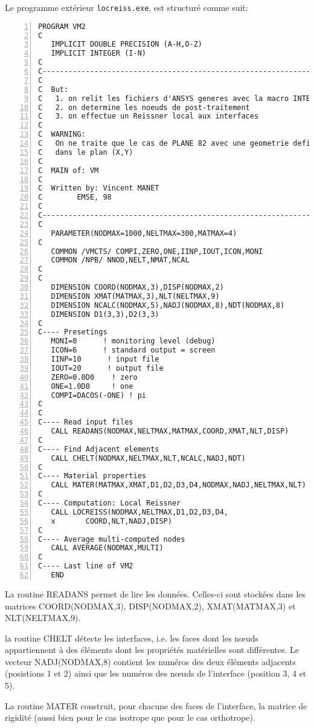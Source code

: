Le programme extérieur \verb|locreiss.exe|, est structuré comme suit:

\color{gris}\scriptsize
\begin{Verbatim}[numbers=left,numbersep=3pt]
   PROGRAM VM2
C
   IMPLICIT DOUBLE PRECISION (A-H,O-Z)
   IMPLICIT INTEGER (I-N)
C
C--------------------------------------------------------------------------
C
C  But:
C   1. on relit les fichiers d'ANSYS generes avec la macro INTERF
C   2. on determine les noeuds de post-traitement
C   3. on effectue un Reissner local aux interfaces
C
C  WARNING:
C   On ne traite que le cas de PLANE 82 avec une geometrie definie
C   dans le plan (X,Y)
C
C  MAIN of: VM
C
C  Written by: Vincent MANET
C        EMSE, 98
C
C----------------------------------------------------------------------------
C
   PARAMETER(NODMAX=1000,NELTMAX=300,MATMAX=4)
C
   COMMON /VMCTS/ COMPI,ZERO,ONE,IINP,IOUT,ICON,MONI
   COMMON /NPB/ NNOD,NELT,NMAT,NCAL
C
C
   DIMENSION COORD(NODMAX,3),DISP(NODMAX,2)
   DIMENSION XMAT(MATMAX,3),NLT(NELTMAX,9)
   DIMENSION NCALC(NODMAX,5),NADJ(NODMAX,8),NDT(NODMAX,8)
   DIMENSION D1(3,3),D2(3,3)
C
C---- Presetings
   MONI=0      ! monitoring level (debug)
   ICON=6      ! standard output = screen
   IINP=10      ! input file
   IOUT=20      ! output file
   ZERO=0.0D0    ! zero
   ONE=1.0D0     ! one
   COMPI=DACOS(-ONE) ! pi
C
C
C---- Read input files
   CALL READANS(NODMAX,NELTMAX,MATMAX,COORD,XMAT,NLT,DISP)
C
C---- Find Adjacent elements
   CALL CHELT(NODMAX,NELTMAX,NLT,NCALC,NADJ,NDT)
C
C---- Material properties
   CALL MATER(MATMAX,XMAT,D1,D2,D3,D4,NODMAX,NADJ,NELTMAX,NLT)
C
C---- Computation: Local Reissner
   CALL LOCREISS(NODMAX,NELTMAX,D1,D2,D3,D4,
   x       COORD,NLT,NADJ,DISP)
C
C---- Average multi-computed nodes
   CALL AVERAGE(NODMAX,MULTI)
C
C---- Last line of VM2
   END
\end{Verbatim}
\color{black}\normalsize

\medskip
La routine READANS permet de lire les données. Celles-ci sont stockées dans les matrices COORD(NODMAX,3), DISP(NODMAX,2), XMAT(MATMAX,3) et NLT(NELTMAX,9).

\medskip
la routine CHELT détecte les interfaces, i.e. les faces dont les nœuds appartiennent à des éléments dont les propriétés matérielles sont différentes.
Le vecteur NADJ(NODMAX,8) contient les numéros des deux éléments adjacents (posistions 1 et 2) ainsi que les numéros des nœuds de l'interface (position 3, 4 et 5).

\medskip
La routine MATER construit, pour chacune des faces de l'interface, la matrice de rigidité (aussi bien pour le cas isotrope que pour le cas orthotrope).

